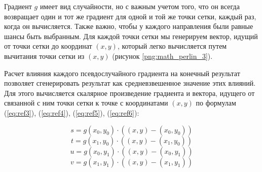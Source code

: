 \begin{figure}[H]
\end{figure}

\begin{figure}[H]
\end{figure}

Градиент $g$ имеет вид случайности, но с важным учетом того, что он всегда возвращает один и тот же градиент для одной и той же точки сетки, каждый раз, когда он вычисляется. Также важно, чтобы у каждого направления были равные шансы быть выбранным. Для каждой точки сетки мы генерируем вектор, идущий от точки сетки до координат $(x, y)$, который легко вычисляется путем вычитания точки сетки из $(x, y)$ (рисунок \ref{png:math_perlin_3}).

\begin{figure}[H]
\end{figure}

Расчет влияния каждого псевдослучайного градиента на конечный результат позволяет сгенерировать результат как средневзвешенное значение этих влияний. Для этого вычисляется скалярное произведение градиента и вектора, идущего от связанной с ним точки сетки к точке с координатами $(x, y)$ по формулам (\ref{eq:ref3}), (\ref{eq:ref4}), (\ref{eq:ref5}), (\ref{eq:ref6}):

\begin{equation}
	s = g(x_0, y_0) \cdot ((x, y) - (x_0, y_0))
	\label{eq:ref3}
\end{equation}
\begin{equation}
	t = g(x_1, y_0) \cdot ((x, y) - (x_1, y_0))
	\label{eq:ref4}
\end{equation}
\begin{equation}
	u = g(x_0, y_1) \cdot ((x, y ) - (x_0, y_1))
	\label{eq:ref5}
\end{equation}
\begin{equation}
	v = g(x_1, y_1) \cdot ((x, y) - (x_1, y_1))
	\label{eq:ref6}
\end{equation}

